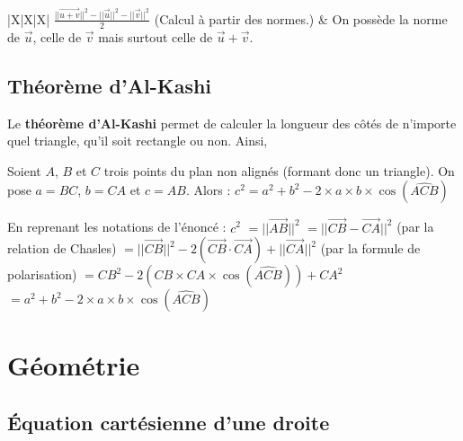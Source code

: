 \begin{tip}
\begin{whitetabularx}{|X|X|X|}
			$\displaystyle{\frac{||\overrightarrow{u + v}||^2 - ||\overrightarrow{u}||^2 - ||\overrightarrow{v}||^2}{2}}$ \medskip (Calcul à partir des normes.) & On possède la norme de $\overrightarrow{u}$, celle de $\overrightarrow{v}$ mais surtout celle de $\overrightarrow{u} + \overrightarrow{v}$. \\
			\hline
		\end{whitetabularx}
	\end{tip}

	\subsection{Théorème d'Al-Kashi}

	Le \textbf{théorème d'Al-Kashi} permet de calculer la longueur des côtés de n'importe quel triangle, qu'il soit rectangle ou non. Ainsi,

	\begin{formula}
		Soient $A$, $B$ et $C$ trois points du plan non alignés (formant donc un triangle). On pose $a = BC$, $b = CA$ et $c = AB$. Alors :
		\newpar
		$c^2 = a^2 + b^2 - 2 \times a \times b \times \cos(\widehat{ACB})$
	\end{formula}

	\begin{demonstration}
		En reprenant les notations de l'énoncé :
		$c^2$
		\newline
		$= ||\overrightarrow{AB}||^2$
		\newline
		$= ||\overrightarrow{CB} - \overrightarrow{CA}||^2$ (par la relation de Chasles)
		\newline
		$= ||\overrightarrow{CB}||^2 - 2(\overrightarrow{CB} \cdot \overrightarrow{CA}) + ||\overrightarrow{CA}||^2$ (par la formule de polarisation)
		\newline
		$= CB^2 - 2(CB \times CA \times \cos(\widehat{ACB})) + CA^2$
		\newline
		$= a^2 + b^2 - 2 \times a \times b \times \cos(\widehat{ACB})$
	\end{demonstration}

	\section{Géométrie}

	\subsection{Équation cartésienne d'une droite}

